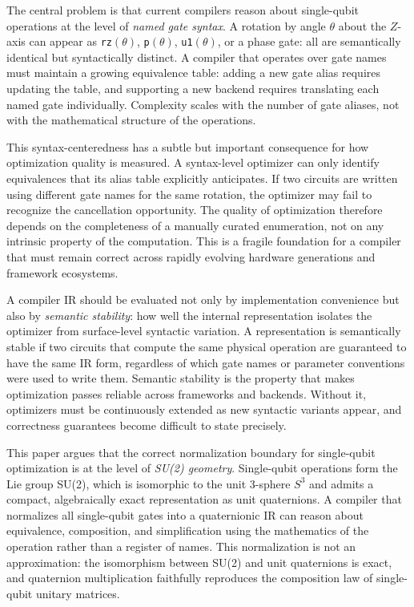 \documentclass[conference]{IEEEtran}
\begin{document}
The central problem is that current compilers reason about single-qubit operations at the
level of \textit{named gate syntax}. A rotation by angle $\theta$ about the $Z$-axis can
appear as \texttt{rz}$(\theta)$, \texttt{p}$(\theta)$, \texttt{u1}$(\theta)$, or a phase
gate: all are semantically identical but syntactically distinct. A compiler that operates
over gate names must maintain a growing equivalence table: adding a new gate alias requires
updating the table, and supporting a new backend requires translating each named gate
individually. Complexity scales with the number of gate aliases, not with the mathematical
structure of the operations.

This syntax-centeredness has a subtle but important consequence for how optimization
quality is measured. A syntax-level optimizer can only identify equivalences that its
alias table explicitly anticipates. If two circuits are written using different gate
names for the same rotation, the optimizer may fail to recognize the cancellation
opportunity. The quality of optimization therefore depends on the completeness of
a manually curated enumeration, not on any intrinsic property of the computation. This
is a fragile foundation for a compiler that must remain correct across rapidly evolving
hardware generations and framework ecosystems.

A compiler IR should be evaluated not only by implementation convenience but also by
\textit{semantic stability}: how well the internal representation isolates the optimizer
from surface-level syntactic variation. A representation is semantically stable if two
circuits that compute the same physical operation are guaranteed to have the same IR form,
regardless of which gate names or parameter conventions were used to write them. Semantic
stability is the property that makes optimization passes reliable across frameworks and
backends. Without it, optimizers must be continuously extended as new syntactic variants
appear, and correctness guarantees become difficult to state precisely.

This paper argues that the correct normalization boundary for single-qubit optimization is
at the level of \textit{SU(2) geometry}. Single-qubit operations form the Lie group SU(2),
which is isomorphic to the unit 3-sphere $S^3$ and admits a compact, algebraically exact
representation as unit quaternions. A compiler that normalizes all single-qubit gates into a
quaternionic IR can reason about equivalence, composition, and simplification using the
mathematics of the operation rather than a register of names. This normalization is not an
approximation: the isomorphism between SU(2) and unit quaternions is exact, and quaternion
multiplication faithfully reproduces the composition law of single-qubit unitary matrices.
\end{document}
